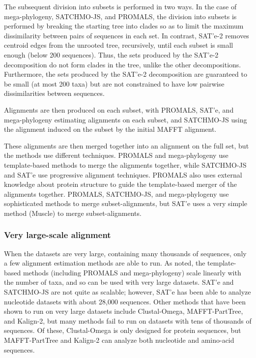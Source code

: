 The subsequent division into subsets is performed in two ways. In the case of 
mega-phylogeny, SATCHMO-JS, and PROMALS, the division into subsets is performed by
breaking the starting tree into clades so as to limit the maximum dissimilarity between
pairs of sequences in each set. In contrast, SAT'e-2 removes centroid edges from the
unrooted tree, recursively, until each subset is small enough (below 200 sequences). Thus,
the sets produced by the SAT'e-2 decomposition do not form clades in the tree, unlike the
other decompositions. Furthermore, the sets produced by the SAT'e-2 decomposition are
guaranteed to be small (at most 200 taxa) but are not constrained to have low pairwise
dissimilarities between sequences.

Alignments are then produced on each subset, with PROMALS, SAT'e, and 
mega-phylogeny estimating alignments on each subset, and SATCHMO-JS using the alignment
induced on the subset by the initial MAFFT alignment.

These alignments are then merged together into an alignment on the full set, but the
methods use different techniques. PROMALS and mega-phylogeny use template-based
methods to merge the alignments together, while SATCHMO-JS and SAT'e use progressive
alignment techniques. PROMALS also uses external knowledge about protein structure
to guide the template-based merger of the alignments together. PROMALS, 
SATCHMO-JS, and mega-phylogeny use sophisticated methods to merge subset-alignments, but SAT'e
uses a very simple method (Muscle) to merge subset-alignments.

\subsubsection{Very large-scale alignment}
When the datasets are very large, containing many
thousands of sequences, only a few alignment estimation methods are able to run. As
noted, the template-based methods (including PROMALS and mega-phylogeny) scale
linearly with the number of taxa, and so can be used with very large datasets. SAT'e
and SATCHMO-JS are not quite as scalable; however, SAT'e has been able to analyze
nucleotide datasets with about 28,000 sequences. Other methods that have been shown to
run on very large datasets include Clustal-Omega, MAFFT-PartTree, and 
Kalign-2, but many methods fail to run on datasets with tens of thousands of sequences.
Of these, Clustal-Omega is only designed for protein sequences, but MAFFT-PartTree
and Kalign-2 can analyze both nucleotide and amino-acid sequences.


